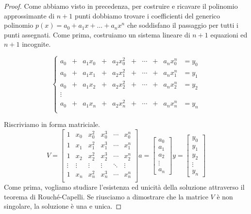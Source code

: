 \documentclass{article}
\theoremstyle{plain}
\theoremstyle{plain}
\theoremstyle{definition}
\theoremstyle{definition}
\begin{document}
\begin{proof}
	Come abbiamo visto in precedenza, per costruire e ricavare il polinomio approssimante di $n+1$ punti  dobbiamo trovare i coefficienti del generico polinomio $p(x)=a_{0}+a_{1}x+\dots+a_{n}x^n$ che soddisfano il passaggio per tutti i punti assegnati. Come prima, costruiamo un sistema lineare di $n+1$ equazioni ed $n+1$ incognite.
	
	\begin{equation*}
		\left\{
		\begin{alignedat}{5}
			a_{0} & +{} &  a_{1}x_{0} & +{} & a_{2}x_{0}^2 & +{} & \cdots & +{} & a_{n}x_{0}^n & = y_{0} \\
			a_{0} & +{} &  a_{1}x_{1} & +{} & a_{2}x_{1}^2 & +{} & \cdots & +{} & a_{n}x_{1}^n & = y_{1} \\
			a_{0} & +{} &  a_{1}x_{2} & +{} & a_{2}x_{2}^2 & +{} & \cdots & +{} & a_{n}x_{2}^n & = y_{2} \\
			\vdots \\
			a_{0} & +{} &  a_{1}x_{n} & +{} & a_{2}x_{n}^2 & +{} & \cdots & +{} & a_{n}x_{n}^n & = y_{n} \\
		\end{alignedat}
		\right.
	\end{equation*}
	
	Riscriviamo in forma matriciale.
	\[
	V=
	\begin{bmatrix}
		1 & x_{0} & x_{0}^2 & x_{0}^3 & \cdots & x_{0}^n \\
		1 & x_{1} & x_{1}^2 & x_{1}^3 & \cdots & x_{1}^n \\
		1 & x_{2} & x_{2}^2 & x_{2}^3 & \cdots & x_{2}^n \\
		\vdots & \vdots & \vdots & \vdots & \ddots & \vdots \\
		1 & x_{n} & x_{n}^2 & x_{n}^3 & \cdots & x_{n}^n \\
	\end{bmatrix}
	a=
	\begin{bmatrix}
		a_{0} \\
		a_{1} \\
		a_{2} \\
		\vdots \\
		a_{n}
	\end{bmatrix}
	y=
	\begin{bmatrix}
		y_{0} \\
		y_{1} \\
		y_{2} \\
		\vdots \\
		y_{n}
	\end{bmatrix}
	\]
	Come prima, vogliamo studiare l'esistenza ed unicità della soluzione attraverso il teorema di Rouché-Capelli. Se riusciamo a dimostrare che la matrice $V$ è non singolare, la soluzione è una e unica. 
	

\end{proof}
\end{document}
